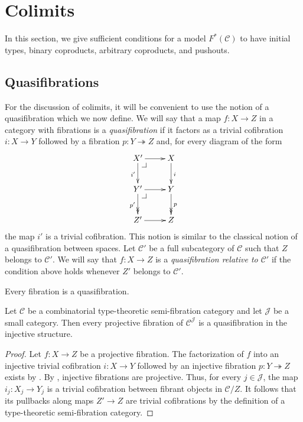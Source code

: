 \documentclass[reqno]{amsart}
\makeatletter
\theoremstyle{definition}
\theoremstyle{remark}
\newcommand{\scat}[1]{\mathcal{#1}}
\numberwithin{figure}{section}
\newcommand{\pb}[1][dr]{\save*!/#1-1.2pc/#1:(-1,1)@^{|-}\restore}
\makeatother
\begin{document}
\section{Colimits}

In this section, we give sufficient conditions for a model $F^*(\scat{C})$ to have initial types, binary coproducts, arbitrary coproducts, and pushouts.

\subsection{Quasifibrations}

For the discussion of colimits, it will be convenient to use the notion of a quasifibration which we now define.
We will say that a map $f : X \to Z$ in a category with fibrations is a \emph{quasifibration} if it factors as a trivial cofibration $i : X \to Y$ followed by a fibration $p : Y \twoheadrightarrow Z$ and, for every diagram of the form
\[ \xymatrix{ X' \ar[r] \ar[d]_{i'} \pb         & X \ar[d]^i \\
              Y' \ar[r] \ar@{->>}[d]_{p'} \pb   & Y \ar@{->>}[d]^p \\
              Z' \ar[r]                         & Z
            } \]
the map $i'$ is a trivial cofibration.
This notion is similar to the classical notion of a quasifibration between spaces.
Let $\scat{C}'$ be a full subcategory of $\scat{C}$ such that $Z$ belongs to $\scat{C}'$.
We will say that $f : X \to Z$ is a \emph{quasifibration relative to $\scat{C}'$} if the condition above holds whenever $Z'$ belongs to $\scat{C}'$.

\begin{example}
Every fibration is a quasifibration.
\end{example}

\begin{lem}
Let $\scat{C}$ be a combinatorial type-theoretic semi-fibration category and let $\scat{J}$ be a small category.
Then every projective fibration of $\scat{C}^\scat{J}$ is a quasifibration in the injective structure.
\end{lem}
\begin{proof}
Let $f : X \to Z$ be a projective fibration.
The factorization of $f$ into an injective trivial cofibration $i : X \to Y$ followed by an injective fibration $p : Y \twoheadrightarrow Z$ exists by \cite[Lemma~A.2.8.3]{lurie-topos}.
By , injective fibrations are projective.
Thus, for every $j \in \scat{J}$, the map $i_j : X_j \to Y_j$ is a trivial cofibration between fibrant objects in $\scat{C}/Z$.
It follows that its pullbacks along maps $Z' \to Z$ are trivial cofibrations by the definition of a type-theoretic semi-fibration category.
\end{proof}
\end{document}
